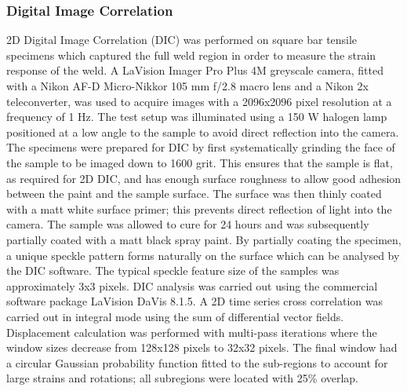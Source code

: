 \subsubsection{Digital Image Correlation}
\label{EMDIC}
2D Digital Image Correlation (DIC) was performed on square bar tensile specimens which captured the full weld region in order to measure the strain response of the weld. A LaVision Imager Pro Plus 4M greyscale camera, fitted with a Nikon AF-D Micro-Nikkor 105 mm f/2.8 macro lens and a Nikon 2x teleconverter, was used to acquire images with a 2096x2096 pixel resolution at a frequency of 1 Hz. The test setup was illuminated using a 150 W halogen lamp positioned at a low angle to the sample to avoid direct reflection into the camera. The specimens were prepared for DIC by first systematically grinding the face of the sample to be imaged down to 1600 grit. This ensures that the sample is flat, as required for 2D DIC, and has enough surface roughness to allow good adhesion between the paint and the sample surface. The surface was then thinly coated with a matt white surface primer; this prevents direct reflection of light into the camera. The sample was allowed to cure for 24 hours and was subsequently partially coated with a matt black spray paint. By partially coating the specimen, a unique speckle pattern forms naturally on the surface which can be analysed by the DIC software. The typical speckle feature size of the samples was approximately 3x3 pixels. DIC analysis was carried out using the commercial software package LaVision DaVis 8.1.5. A 2D time series cross correlation was carried out in integral mode using the sum of differential vector fields. Displacement calculation was performed with multi-pass iterations where the window sizes decrease from 128x128 pixels to 32x32 pixels. The final window had a circular Gaussian probability function fitted to the sub-regions to account for large strains and rotations; all subregions were located with 25\% overlap.
